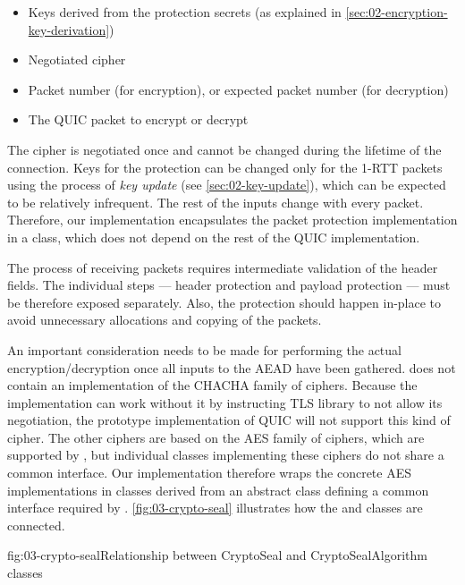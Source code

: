 \begin{itemize}

  \item Keys derived from the protection secrets (as explained in
  \autoref{sec:02-encryption-key-derivation})

  \item Negotiated cipher

  \item Packet number (for encryption), or expected packet number (for decryption)

  \item The QUIC packet to encrypt or decrypt

\end{itemize}

The cipher is negotiated once and cannot be changed during the lifetime of the connection. Keys for
the protection can be changed only for the 1-RTT packets using the process of \textit{key update}
(see \autoref{sec:02-key-update}), which can be expected to be relatively infrequent. The rest of
the inputs change with every packet. Therefore, our implementation encapsulates the packet
protection implementation in a  class, which does not depend on the rest of the
QUIC implementation.

The process of receiving packets requires intermediate validation of the header fields. The
individual steps --- header protection and payload protection --- must be therefore exposed separately.
Also, the protection should happen in-place to avoid unnecessary allocations and copying of the
packets.

An important consideration needs to be made for performing the actual encryption/decryption once all
inputs to the AEAD have been gathered. \dotnet{} does not contain an implementation of the CHACHA
family of ciphers. Because the implementation can work without it by instructing TLS library to not
allow its negotiation, the prototype implementation of QUIC will not support this kind of cipher.
The other ciphers are based on the AES family of ciphers, which are supported by \dotnet{}, but
individual classes implementing these ciphers do not share a common interface. Our implementation
therefore wraps the concrete AES implementations in classes derived from an abstract
 class defining a common interface required by \CryptoSeal{}.
\autoref{fig:03-crypto-seal} illustrates how the \CryptoSeal{} and 
classes are connected.

\begin{myFigure}{fig:03-crypto-seal}{Relationship between CryptoSeal and CryptoSealAlgorithm classes}

  \resizebox{\linewidth}{!}{}

\end{myFigure}

